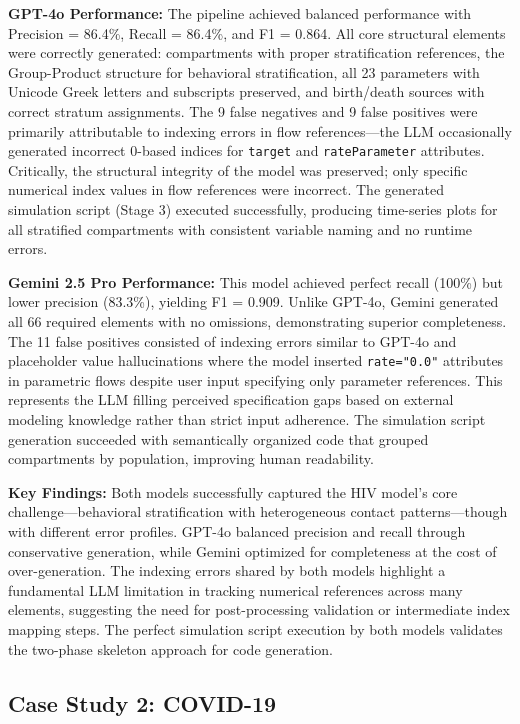 \textbf{GPT-4o Performance:} The pipeline achieved balanced performance with Precision = 86.4\%, Recall = 86.4\%, and F1 = 0.864. All core structural elements were correctly generated: compartments with proper stratification references, the Group-Product structure for behavioral stratification, all 23 parameters with Unicode Greek letters and subscripts preserved, and birth/death sources with correct stratum assignments. The 9 false negatives and 9 false positives were primarily attributable to indexing errors in flow references—the LLM occasionally generated incorrect 0-based indices for \texttt{target} and \texttt{rateParameter} attributes. Critically, the structural integrity of the model was preserved; only specific numerical index values in flow references were incorrect. The generated simulation script (Stage 3) executed successfully, producing time-series plots for all stratified compartments with consistent variable naming and no runtime errors.

\textbf{Gemini 2.5 Pro Performance:} This model achieved perfect recall (100\%) but lower precision (83.3\%), yielding F1 = 0.909. Unlike GPT-4o, Gemini generated all 66 required elements with no omissions, demonstrating superior completeness. The 11 false positives consisted of indexing errors similar to GPT-4o and placeholder value hallucinations where the model inserted \texttt{rate="0.0"} attributes in parametric flows despite user input specifying only parameter references. This represents the LLM filling perceived specification gaps based on external modeling knowledge rather than strict input adherence. The simulation script generation succeeded with semantically organized code that grouped compartments by population, improving human readability.

\textbf{Key Findings:} Both models successfully captured the HIV model's core challenge—behavioral stratification with heterogeneous contact patterns—though with different error profiles. GPT-4o balanced precision and recall through conservative generation, while Gemini optimized for completeness at the cost of over-generation. The indexing errors shared by both models highlight a fundamental LLM limitation in tracking numerical references across many elements, suggesting the need for post-processing validation or intermediate index mapping steps. The perfect simulation script execution by both models validates the two-phase skeleton approach for code generation.

\subsection{Case Study 2: COVID-19}
\label{sec:casestudy:covid}

